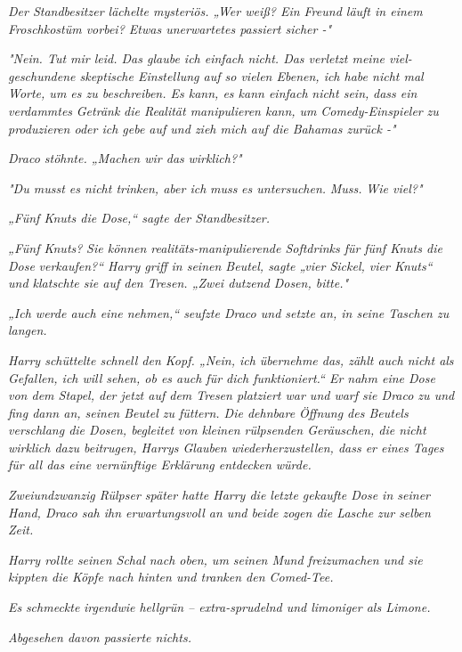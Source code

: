 {\emph{Der Standbesitzer lächelte mysteriös. „Wer weiß? Ein Freund läuft in einem Froschkostüm vorbei? Etwas unerwartetes passiert sicher -"}

\emph{"Nein. Tut mir leid. Das glaube ich einfach nicht. Das verletzt meine viel-geschundene skeptische Einstellung auf so vielen Ebenen, ich habe nicht mal Worte, um es zu beschreiben. Es kann, es kann einfach} \emph{\emph{nicht sein,}} \emph{dass ein verdammtes} \emph{\emph{Getränk}} \emph{die Realität manipulieren kann, um} \emph{\emph{Comedy-Einspieler}} \emph{zu produzieren oder ich gebe auf und zieh mich auf die Bahamas zurück -"}

\emph{Draco stöhnte. „Machen wir das} \emph{\emph{wirklich?}"}

\emph{"Du musst es nicht trinken, aber ich} \emph{\emph{muss}} \emph{es untersuchen.} \emph{\emph{Muss.}} \emph{Wie viel?"}

\emph{„Fünf Knuts die Dose,“ sagte der Standbesitzer.}

\emph{„\emph{Fünf Knuts?}} \emph{Sie können realitäts-manipulierende Softdrinks für} \emph{\emph{fünf Knuts die Dose}} \emph{verkaufen?“ Harry griff in seinen Beutel, sagte „vier Sickel, vier Knuts“ und klatschte sie auf den Tresen. „Zwei dutzend Dosen, bitte."}

\emph{„Ich werde auch eine nehmen,“ seufzte Draco und setzte an, in seine Taschen zu langen.}

\emph{Harry schüttelte schnell den Kopf. „Nein, ich übernehme das, zählt auch nicht als Gefallen, ich will sehen, ob es auch für dich funktioniert.“ Er nahm eine Dose von dem Stapel, der jetzt auf dem Tresen platziert war und warf sie Draco zu und fing dann an, seinen Beutel zu füttern. Die dehnbare Öffnung des Beutels verschlang die Dosen, begleitet von kleinen rülpsenden Geräuschen, die nicht wirklich dazu beitrugen, Harrys Glauben wiederherzustellen, dass er eines Tages für all das eine vernünftige Erklärung entdecken würde.}

\emph{Zweiundzwanzig Rülpser später hatte Harry die letzte gekaufte Dose in seiner Hand, Draco sah ihn erwartungsvoll an und beide zogen die Lasche} \emph{zur selben Zeit.}

\emph{Harry rollte seinen Schal nach oben, um seinen Mund freizumachen und sie kippten die Köpfe nach hinten und tranken den Comed-Tee.}

\emph{Es} \emph{\emph{schmeckte}} \emph{irgendwie hellgrün -- extra-sprudelnd und limoniger als Limone.}

\emph{Abgesehen davon passierte nichts.}

}
